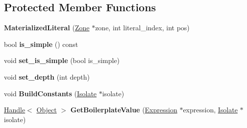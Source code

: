 \subsection*{Protected Member Functions}
\begin{DoxyCompactItemize}
\item 
\hypertarget{classv8_1_1internal_1_1_materialized_literal_a34f60085fdc4b897de5228308a3cc05b}{}{\bfseries Materialized\+Literal} (\hyperlink{classv8_1_1internal_1_1_zone}{Zone} $\ast$zone, int literal\+\_\+index, int pos)\label{classv8_1_1internal_1_1_materialized_literal_a34f60085fdc4b897de5228308a3cc05b}

\item 
\hypertarget{classv8_1_1internal_1_1_materialized_literal_a643c47090fae04dc32ec66973734f38d}{}bool {\bfseries is\+\_\+simple} () const \label{classv8_1_1internal_1_1_materialized_literal_a643c47090fae04dc32ec66973734f38d}

\item 
\hypertarget{classv8_1_1internal_1_1_materialized_literal_a55d53455fa0e5d33bc1c73edb99a23d3}{}void {\bfseries set\+\_\+is\+\_\+simple} (bool is\+\_\+simple)\label{classv8_1_1internal_1_1_materialized_literal_a55d53455fa0e5d33bc1c73edb99a23d3}

\item 
\hypertarget{classv8_1_1internal_1_1_materialized_literal_a1a52f1c2c35cfdf122ad0bcea7e6e2a6}{}void {\bfseries set\+\_\+depth} (int depth)\label{classv8_1_1internal_1_1_materialized_literal_a1a52f1c2c35cfdf122ad0bcea7e6e2a6}

\item 
\hypertarget{classv8_1_1internal_1_1_materialized_literal_a8aa06fd94266a295ae6628925fea436d}{}void {\bfseries Build\+Constants} (\hyperlink{classv8_1_1internal_1_1_isolate}{Isolate} $\ast$isolate)\label{classv8_1_1internal_1_1_materialized_literal_a8aa06fd94266a295ae6628925fea436d}

\item 
\hypertarget{classv8_1_1internal_1_1_materialized_literal_a3f2e9681f5506407af5bf2c23e142bbd}{}\hyperlink{classv8_1_1internal_1_1_handle}{Handle}$<$ \hyperlink{classv8_1_1internal_1_1_object}{Object} $>$ {\bfseries Get\+Boilerplate\+Value} (\hyperlink{classv8_1_1internal_1_1_expression}{Expression} $\ast$expression, \hyperlink{classv8_1_1internal_1_1_isolate}{Isolate} $\ast$isolate)\label{classv8_1_1internal_1_1_materialized_literal_a3f2e9681f5506407af5bf2c23e142bbd}

\end{DoxyCompactItemize}
